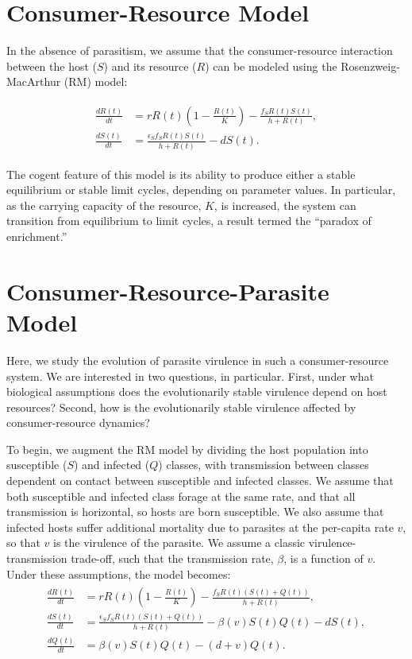 \documentclass[12pt,reqno,final,pdftex]{amsart}\usepackage[]{graphicx}\usepackage[]{color}
\theoremstyle{plain}
\numberwithin{equation}{part}
\begin{document}
\section*{Consumer-Resource Model}

In the absence of parasitism, we assume that the consumer-resource interaction between the host ($S$) and its resource ($R$) can be modeled using the Rosenzweig-MacArthur (RM) model:

\begin{align}
\begin{split}
\frac{dR(t)}{dt} &= r R(t) \left(1 - \frac{R(t)}{K}\right) - \frac{f_S R(t) S(t)}{h + R(t)}, \\
\frac{dS(t)}{dt} &= \frac{\epsilon_S f_S R(t) S(t)}{h + R(t)} - d S(t).
\end{split}
\end{align}

The cogent feature of this model is its ability to produce either a stable equilibrium or stable limit cycles, depending on parameter values.
In particular, as the carrying capacity of the resource, $K$, is increased, the system can transition from equilibrium to limit cycles, a result termed the ``paradox of enrichment.''

\section*{Consumer-Resource-Parasite Model}
Here, we study the evolution of parasite virulence in such a consumer-resource system.
We are interested in two questions, in particular.
First, under what biological assumptions does the evolutionarily stable virulence depend on host resources?
Second, how is the evolutionarily stable virulence affected by consumer-resource dynamics?

To begin, we augment the RM model by dividing the host population into susceptible ($S$) and infected ($Q$) classes, with transmission between classes dependent on contact between susceptible and infected classes.
We assume that both susceptible and infected class forage at the same rate, and that all transmission is horizontal, so hosts are born susceptible.
We also assume that infected hosts suffer additional mortality due to parasites at the per-capita rate $v$, so that $v$ is the virulence of the parasite.
We assume a classic virulence-transmission trade-off, such that the transmission rate, $\beta$, is a function of $v$.
Under these assumptions, the model becomes:
\begin{align}\label{RSQ}
\begin{split}
\frac{dR(t)}{dt} &= r R(t) \left(1 - \frac{R(t)}{K}\right) - \frac{f_S R(t) (S(t)+Q(t))}{h + R(t)}, \\
\frac{dS(t)}{dt} &= \frac{\epsilon_S f_S R(t) (S(t)+Q(t))}{h + R(t)} - \beta(v) S(t) Q(t)- d S(t), \\
\frac{dQ(t)}{dt} &= \beta(v) S(t) Q(t) - (d + v)Q(t).
\end{split}
\end{align}
\end{document}

